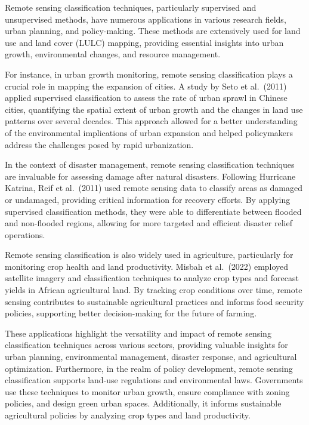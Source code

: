 \documentclass[
  letterpaper,
  DIV=11,
  numbers=noendperiod]{scrreprt}
\begin{document}
Remote sensing classification techniques, particularly supervised and
unsupervised methods, have numerous applications in various research
fields, urban planning, and policy-making. These methods are extensively
used for land use and land cover (LULC) mapping, providing essential
insights into urban growth, environmental changes, and resource
management.

For instance, in urban growth monitoring, remote sensing classification
plays a crucial role in mapping the expansion of cities. A study by Seto
et al.~(2011) applied supervised classification to assess the rate of
urban sprawl in Chinese cities, quantifying the spatial extent of urban
growth and the changes in land use patterns over several decades. This
approach allowed for a better understanding of the environmental
implications of urban expansion and helped policymakers address the
challenges posed by rapid urbanization.

In the context of disaster management, remote sensing classification
techniques are invaluable for assessing damage after natural disasters.
Following Hurricane Katrina, Reif et al.~(2011) used remote sensing data
to classify areas as damaged or undamaged, providing critical
information for recovery efforts. By applying supervised classification
methods, they were able to differentiate between flooded and non-flooded
regions, allowing for more targeted and efficient disaster relief
operations.

Remote sensing classification is also widely used in agriculture,
particularly for monitoring crop health and land productivity. Misbah et
al.~(2022) employed satellite imagery and classification techniques to
analyze crop types and forecast yields in African agricultural land. By
tracking crop conditions over time, remote sensing contributes to
sustainable agricultural practices and informs food security policies,
supporting better decision-making for the future of farming.

These applications highlight the versatility and impact of remote
sensing classification techniques across various sectors, providing
valuable insights for urban planning, environmental management, disaster
response, and agricultural optimization. Furthermore, in the realm of
policy development, remote sensing classification supports land-use
regulations and environmental laws. Governments use these techniques to
monitor urban growth, ensure compliance with zoning policies, and design
green urban spaces. Additionally, it informs sustainable agricultural
policies by analyzing crop types and land productivity.
\end{document}

